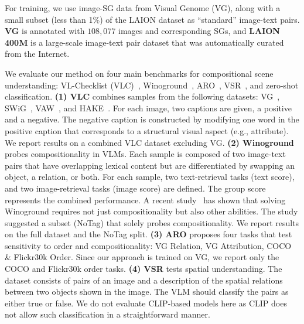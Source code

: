 \documentclass[11pt]{article}
\newcommand{\minisection}[1]{\noindent{\textbf{#1}.}}
\begin{document}
\minisection{Training} For training, we use image-SG data from Visual Genome (VG), along with a small subset (less than 1\%) of the LAION dataset as ``standard'' image-text pairs. \textbf{VG} is annotated with $108,077$ images and corresponding SGs, and \textbf{LAION 400M} is a large-scale image-text pair dataset that was automatically curated from the Internet. 












\minisection{Evaluation} We evaluate our method on four main benchmarks for compositional scene understanding: VL-Checklist (VLC)~\cite{vlc}, Winoground~\cite{winoground}, ARO~\cite{yuksekgonul2023when}, VSR~\cite{Liu2022VisualSR}, and zero-shot classification. \textbf{(1) VLC} combines samples from the following datasets: VG~\cite{krishna2017visual}, SWiG~\cite{swig}, VAW~\cite{vaw}, and HAKE~\cite{hake}. For each image, two captions are given, a positive and a negative. The negative caption is constructed by modifying one word in the positive caption that corresponds to a structural visual aspect (e.g., attribute). We report results on a combined VLC dataset excluding VG. \textbf{(2) Winoground} probes compositionality in VLMs. 
Each sample is composed of two image-text pairs that have overlapping lexical content but are differentiated by swapping an object, a relation, or both. For each sample, two text-retrieval tasks (text score), and two image-retrieval tasks (image score) are defined. The group score represents the combined performance. A recent study~\cite{Diwan2022WhyIW} has shown that solving  Winoground requires not just compositionality but also other abilities. The study suggested a subset (NoTag) that solely probes compositionality. We report results on the full dataset and the NoTag split. \textbf{(3) ARO} 
proposes four tasks that test sensitivity to order and compositionality: VG Relation, VG Attribution, COCO \& Flickr30k Order. Since our approach is trained on VG, we report only the COCO and Flickr30k order tasks.
\textbf{(4) VSR} tests spatial understanding. The dataset consists of pairs of an image and a description of the spatial relations between two objects shown in the image. The VLM should classify the pairs as either true or false. We do not evaluate CLIP-based models here as CLIP does not allow such classification in a straightforward manner. 
\end{document}
